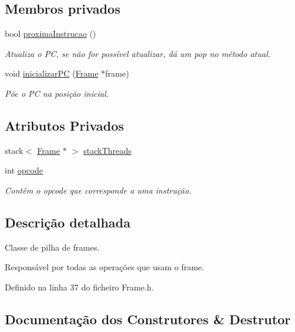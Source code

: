 \subsection*{Membros privados}
\begin{DoxyCompactItemize}
\item 
bool \hyperlink{classFrameStack_ad5ddcee58ef6c1306b47168846285b4f}{proxima\+Instrucao} ()
\begin{DoxyCompactList}\small\item\em Atualiza o PC, se não for possível atualizar, dá um pop no método atual. \end{DoxyCompactList}\item 
void \hyperlink{classFrameStack_a9ec8c638092ec1ef9a00d09fde4b3d6f}{inicializar\+PC} (\hyperlink{Frame_8h_acc380914b41a084dcc8e4b38fb200145}{Frame} $\ast$frame)
\begin{DoxyCompactList}\small\item\em Põe o PC na posição inicial. \end{DoxyCompactList}\end{DoxyCompactItemize}
\subsection*{Atributos Privados}
\begin{DoxyCompactItemize}
\item 
stack$<$ \hyperlink{Frame_8h_acc380914b41a084dcc8e4b38fb200145}{Frame} $\ast$ $>$ \hyperlink{classFrameStack_a99712833509e9c94197fa964fbf7965b}{stack\+Threads}
\item 
int \hyperlink{classFrameStack_afbf19cd37c13a8058ab600205337c889}{opcode}
\begin{DoxyCompactList}\small\item\em Contêm o opcode que corresponde a uma instrução. \end{DoxyCompactList}\end{DoxyCompactItemize}


\subsection{Descrição detalhada}
Classe de pilha de frames. 

Responsável por todas as operações que usam o frame. 

Definido na linha 37 do ficheiro Frame.\+h.



\subsection{Documentação dos Construtores \& Destrutor}
\mbox{\label{classFrameStack_a15d2d0d6497cd5d398fdc1b9862a1e3a}} 
